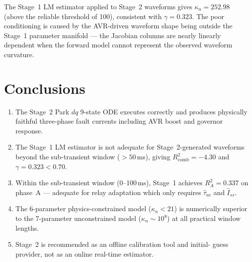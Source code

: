 \documentclass[12pt,a4paper]{article}
\theoremstyle{definition}
\theoremstyle{plain}
\begin{document}
The Stage~1 LM estimator applied to Stage~2 waveforms gives
$\kappa_n = 252.98$ (above the reliable threshold of 100), consistent with
$\gamma = 0.323$.  The poor conditioning is caused by the AVR-driven
waveform shape being outside the Stage~1 parameter manifold — the Jacobian
columns are nearly linearly dependent when the forward model cannot represent
the observed waveform curvature.

\section{Conclusions}
\label{sec:conc}

\begin{enumerate}
  \item The Stage~2 Park $dq$ 9-state ODE executes correctly and produces
        physically faithful three-phase fault currents including AVR boost
        and governor response.
  \item The Stage~1 LM estimator is not adequate for Stage~2-generated
        waveforms beyond the sub-transient window ($> 50$\,ms), giving
        $R^2_{\mathrm{comb}} = -4.30$ and $\gamma = 0.323 < 0.70$.
  \item Within the sub-transient window (0--100\,ms), Stage~1 achieves
        $R^2_A = 0.337$ on phase~A — adequate for relay adaptation which
        only requires $\hat{\tau}_{ac}$ and $\hat{I}_{ss}$.
  \item The 6-parameter physics-constrained model ($\kappa_n < 21$) is
        numerically superior to the 7-parameter unconstrained model
        ($\kappa_n \sim 10^8$) at all practical window lengths.
  \item Stage~2 is recommended as an offline calibration tool and initial-
        guess provider, not as an online real-time estimator.
\end{enumerate}


\end{document}
